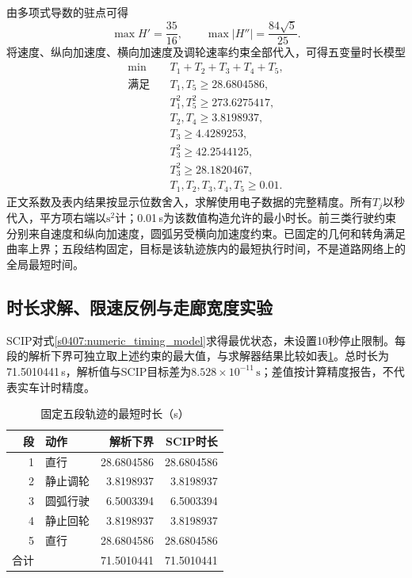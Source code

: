 由多项式导数的驻点可得
\begin{equation}
 \max H'=\frac{35}{16},\qquad
 \max|H''|=\frac{84\sqrt5}{25}.
\end{equation}
将速度、纵向加速度、横向加速度及调轮速率约束全部代入，可得五变量时长模型
\begin{subequations}
\begin{align}
 \min\quad &T_1+T_2+T_3+T_4+T_5,\\
 \text{满足}\quad
 &T_1,T_5\ge 28.6804586,\\
 &T_1^2,T_5^2\ge 273.6275417,\\
 &T_2,T_4\ge 3.8198937,\\
 &T_3\ge 4.4289253,\\
 &T_3^2\ge 42.2544125,\\
 &T_3^2\ge 28.1820467,\\
 &T_1,T_2,T_3,T_4,T_5\ge0.01.
\end{align}
\label{s0407:numeric_timing_model}
\end{subequations}
正文系数及表内结果按显示位数舍入，求解使用电子数据的完整精度。所有$T_j$以秒代入，平方项右端以$\mathrm s^2$计；0.01\,s为该数值构造允许的最小时长。前三类行驶约束分别来自速度和纵向加速度，圆弧另受横向加速度约束。已固定的几何和转角满足曲率上界；五段结构固定，目标是该轨迹族内的最短执行时间，不是道路网络上的全局最短时间。

\subsection{时长求解、限速反例与走廊宽度实验}

SCIP对式\eqref{s0407:numeric_timing_model}求得最优状态，未设置10秒停止限制。每段的解析下界可独立取上述约束的最大值，与求解器结果比较如表\ref{s0407:timing_result}。总时长为71.5010441\,s，解析值与SCIP目标差为$8.528\times10^{-11}\,\mathrm s$；差值按计算精度报告，不代表实车计时精度。
\begin{table}[htbp]
\centering\small
\caption{固定五段轨迹的最短时长（s）}
\label{s0407:timing_result}
\begin{tabular}{@{}rlrr@{}}
\toprule
段 & 动作 & 解析下界 & SCIP时长\\
\midrule
1 & 直行 & 28.6804586 & 28.6804586\\
2 & 静止调轮 & 3.8198937 & 3.8198937\\
3 & 圆弧行驶 & 6.5003394 & 6.5003394\\
4 & 静止回轮 & 3.8198937 & 3.8198937\\
5 & 直行 & 28.6804586 & 28.6804586\\
\midrule
合计 & & 71.5010441 & 71.5010441\\
\bottomrule
\end{tabular}
\end{table}

